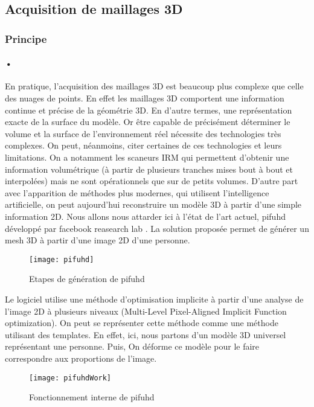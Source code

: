 \subsection{Acquisition de maillages 3D}
\subsubsection{Principe}
\paragraph{•} En pratique, l'acquisition des maillages 3D est beaucoup plus complexe que celle des nuages de points. En effet les maillages 3D comportent une information continue et précise de la géométrie 3D. En d'autre termes, une représentation exacte de la surface du modèle. Or être capable de précisément déterminer le volume et la surface de l’environnement réel nécessite des technologies très complexes.
On peut, néanmoins, citer certaines de ces technologies et leurs limitations. On a notamment les scaneurs IRM qui permettent d'obtenir une information volumétrique (à partir de plusieurs tranches mises bout à bout et interpolées) mais ne sont opérationnels que sur de petits volumes.
\newline
D'autre part avec l’apparition de méthodes plus modernes, qui utilisent l'intelligence artificielle, on peut aujourd’hui reconstruire un modèle 3D à partir d'une simple information 2D. Nous allons nous attarder ici à l'état de l'art actuel, pifuhd développé par facebook reasearch lab \cite{saito2020pifuhd}.
La solution proposée permet de générer un mesh 3D à partir d'une image 2D d'une personne.

\begin{figure}[h]
    \centering
    \texttt{[image: pifuhd]}
    \caption{Etapes de génération de pifuhd}
    \label{fig:pifuhd}
\end{figure}
\FloatBarrier

Le logiciel utilise une méthode d'optimisation implicite à partir d'une analyse de l'image 2D à plusieurs niveaux (Multi-Level Pixel-Aligned Implicit Function optimization). On peut se représenter cette méthode comme une méthode utilisant des templates. En effet, ici, nous partons d'un modèle 3D universel représentant une personne. Puis, On déforme ce modèle pour le faire correspondre aux proportions de l'image.

\begin{figure}[h]
    \centering
    \texttt{[image: pifuhdWork]}
    \caption{Fonctionnement interne de pifuhd}
    \label{fig:pifuhdWork}
\end{figure}
\FloatBarrier

